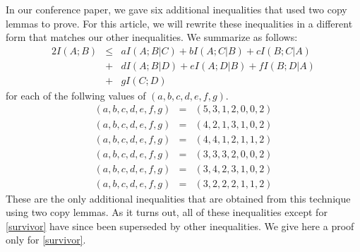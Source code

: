 \documentclass[10pt,journal]{IEEEtran}
\begin{document}
In our conference paper, we gave six additional inequalities that used two copy lemmas to prove.
For this article, we will rewrite these inequalities in a different form that matches our other inequalities.
We summarize as follows:
\begin{eqnarray*}
2I(A;B) &\leq& aI(A;B|C) + bI(A;C|B) + cI(B;C|A) \\
      &+&  dI(A;B|D) + eI(A;D|B)+ fI(B;D|A)\\
      &+& gI(C;D)
\end{eqnarray*}
for each of the follwing values of $(a,b,c,d,e,f,g)$.
\begin{eqnarray}
(a,b,c,d,e,f,g) &=& (5,3,1,2,0,0,2) \label{Matus2}\\
(a,b,c,d,e,f,g) &=& (4,2,1,3,1,0,2) \label{survivor}\\
(a,b,c,d,e,f,g) &=& (4,4,1,2,1,1,2) \\
(a,b,c,d,e,f,g) &=& (3,3,3,2,0,0,2) \\
(a,b,c,d,e,f,g) &=& (3,4,2,3,1,0,2) \\
(a,b,c,d,e,f,g) &=& (3,2,2,2,1,1,2)
\end{eqnarray}
These are the only additional inequalities that are obtained from this technique using two copy lemmas.
As it turns out, all of these inequalities except for \eqref{survivor} have since been superseded by
other inequalities.  We give here a proof only for \eqref{survivor}.
\end{document}
